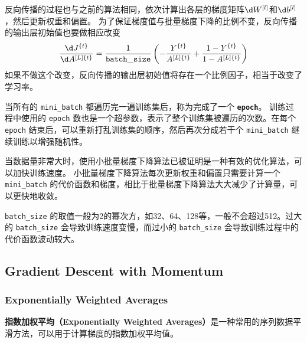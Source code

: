 反向传播的过程也与之前的算法相同，依次计算出各层的梯度矩阵$\d W^{[l]}$和$\d b^{[l]}$，然后更新权重和偏置。
为了保证梯度值与批量梯度下降的比例不变，反向传播的输出层初始值也要做相应改变
\begin{equation}
    \frac{\d J^{\{t\}}}{\d A^{[L]\{t\}}} 
    = \frac{1}{\mathtt{batch\_size}} \left(-\frac{Y^{\{t\}}}{A^{[L]\{t\}}} + \frac{1 - Y^{\{t\}}}{1 - A^{[L]\{t\}}}\right)
\end{equation}
如果不做这个改变，反向传播的输出层初始值将存在一个比例因子，相当于改变了学习率。

当所有的 \verb|mini_batch| 都遍历完一遍训练集后，称为完成了一个 \texttt{\textbf{epoch}}。
训练过程中使用的 \verb|epoch| 数也是一个超参数，表示了整个训练集被遍历的次数。在每个 \verb|epoch| 结束后，可以重新打乱训练集的顺序，然后再次分成若干个 \verb|mini_batch| 继续训练以增强随机性。

当数据量非常大时，使用小批量梯度下降算法已被证明是一种有效的优化算法，可以加快训练速度。
小批量梯度下降算法每次更新权重和偏置只需要计算一个 \verb|mini_batch| 的代价函数和梯度，相比于批量梯度下降算法大大减少了计算量，可以更快地收敛。

\verb|batch_size| 的取值一般为2的幂次方，如32、64、128等，一般不会超过512。过大的 \verb|batch_size| 会导致训练速度变慢，而过小的 \verb|batch_size| 会导致训练过程中的代价函数波动较大。

\subsection{Gradient Descent with Momentum}

\subsubsection{Exponentially Weighted Averages}

\textbf{指数加权平均（Exponentially Weighted Averages）}是一种常用的序列数据平滑方法，可以用于计算梯度的指数加权平均值。

